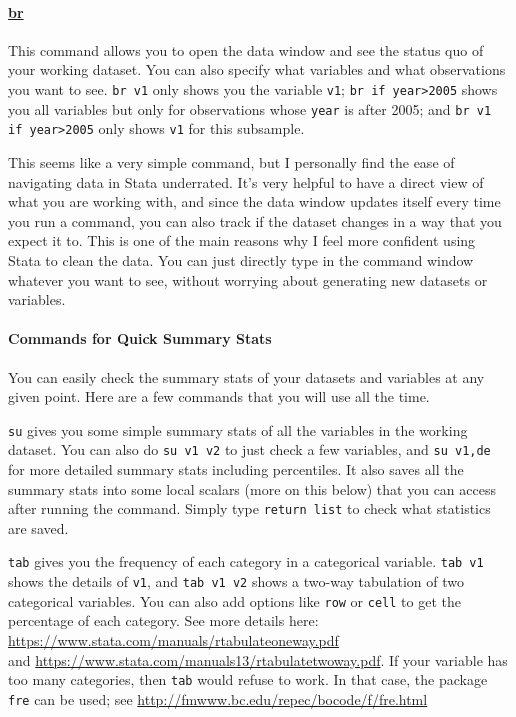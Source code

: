 \paragraph{\underline{br}} This command allows you to open the data window and see the status quo of your working dataset. You can also specify what variables and what observations you want to see. \verb|br v1| only shows you the variable \verb|v1|; \verb|br if year>2005| shows you all variables but only for observations whose \verb|year| is after 2005; and \verb|br v1 if year>2005| only shows \verb|v1| for this subsample. 

This seems like a very simple command, but I personally find the ease of navigating data in Stata underrated. It's very helpful to have a direct view of what you are working with, and since the data window updates itself every time you run a command, you can also track if the dataset changes in a way that you expect it to. This is one of the main reasons why I feel more confident using Stata to clean the data. You can just directly type in the command window whatever you want to see, without worrying about generating new datasets or variables.  

\paragraph{Commands for Quick Summary Stats} You can easily check the summary stats of your datasets and variables at any given point. Here are a few commands that you will use all the time.

\verb|su| gives you some simple summary stats of all the variables in the working dataset. You can also do \verb|su v1 v2| to just check a few variables, and \verb|su v1,de| for more detailed summary stats including percentiles. It also saves all the summary stats into some local scalars (more on this below) that you can access after running the command. Simply type \verb|return list| to check what statistics are saved. 

\verb|tab| gives you the frequency of each category in a categorical variable. \verb|tab v1| shows the details of \verb|v1|, and \verb|tab v1 v2| shows a two-way tabulation of two categorical variables. You can also add options like \verb|row| or \verb|cell| to get the percentage of each category. See more details here: \url{https://www.stata.com/manuals/rtabulateoneway.pdf} \\
and \url{https://www.stata.com/manuals13/rtabulatetwoway.pdf}. If your variable has too many categories, then \verb|tab| would refuse to work. In that case, the package \verb|fre| can be used; see \url{http://fmwww.bc.edu/repec/bocode/f/fre.html}

